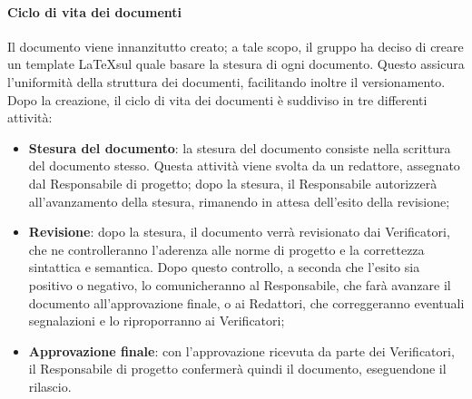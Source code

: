 \documentclass[../norme-di-progetto.tex]{subfiles}
\begin{document}
\paragraph{Ciclo di vita dei documenti}
Il documento viene innanzitutto creato; a tale scopo, il gruppo ha deciso di creare un template \LaTeX sul quale basare la stesura di ogni documento. Questo assicura l'uniformità della struttura dei documenti, facilitando inoltre il versionamento. \\
Dopo la creazione, il ciclo di vita dei documenti è suddiviso in tre differenti attività:
\begin{itemize}
  \item \textbf{Stesura del documento}: la stesura del documento consiste nella scrittura del documento stesso. Questa attività viene svolta da un redattore, assegnato dal Responsabile di progetto; dopo la stesura, il Responsabile autorizzerà all'avanzamento della stesura, rimanendo in attesa dell'esito della revisione;
  \item \textbf{Revisione}: dopo la stesura, il documento verrà revisionato dai Verificatori, che ne controlleranno l'aderenza alle norme di progetto e la correttezza sintattica e semantica. Dopo questo controllo, a seconda che l'esito sia positivo o negativo, lo comunicheranno al Responsabile, che farà avanzare il documento all'approvazione finale, o ai Redattori, che correggeranno eventuali segnalazioni e lo riproporranno ai Verificatori;
  \item \textbf{Approvazione finale}: con l'approvazione ricevuta da parte dei Verificatori, il Responsabile di progetto confermerà quindi il documento, eseguendone il rilascio.
\end{itemize}
\end{document}
